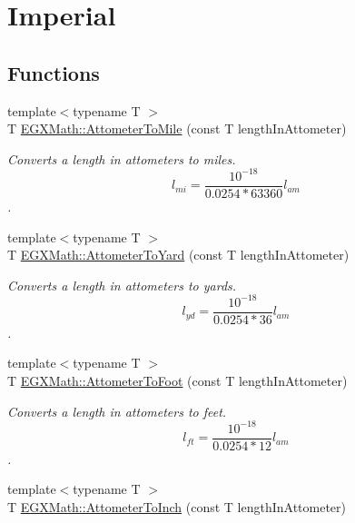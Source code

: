 \hypertarget{group___e_g_x_math-_conversions-_length_conversions-_attometer-_imperial}{}\section{Imperial}
\label{group___e_g_x_math-_conversions-_length_conversions-_attometer-_imperial}
\subsection*{Functions}
\begin{DoxyCompactItemize}
\item 
{\footnotesize template$<$typename T $>$ }\\T \mbox{\hyperlink{group___e_g_x_math-_conversions-_length_conversions-_attometer-_imperial_ga5525f722f588a2bb0a480c56d452fd3f}{E\+G\+X\+Math\+::\+Attometer\+To\+Mile}} (const T length\+In\+Attometer)
\begin{DoxyCompactList}\small\item\em Converts a length in attometers to miles. \[ l_{mi}=\frac{10^{-18}}{0.0254 * 63360} l_{am} \]. \end{DoxyCompactList}\item 
{\footnotesize template$<$typename T $>$ }\\T \mbox{\hyperlink{group___e_g_x_math-_conversions-_length_conversions-_attometer-_imperial_gaa88d881301681b0864a866ef45ad041c}{E\+G\+X\+Math\+::\+Attometer\+To\+Yard}} (const T length\+In\+Attometer)
\begin{DoxyCompactList}\small\item\em Converts a length in attometers to yards. \[ l_{yd}= \frac{10^{-18}}{0.0254 * 36} l_{am} \]. \end{DoxyCompactList}\item 
{\footnotesize template$<$typename T $>$ }\\T \mbox{\hyperlink{group___e_g_x_math-_conversions-_length_conversions-_attometer-_imperial_gaa4c9d59d58ec5811452592887a0261d9}{E\+G\+X\+Math\+::\+Attometer\+To\+Foot}} (const T length\+In\+Attometer)
\begin{DoxyCompactList}\small\item\em Converts a length in attometers to feet. \[ l_{ft}= \frac{10^{-18}}{0.0254 * 12} l_{am} \]. \end{DoxyCompactList}\item 
{\footnotesize template$<$typename T $>$ }\\T \mbox{\hyperlink{group___e_g_x_math-_conversions-_length_conversions-_attometer-_imperial_ga76cb652df52a89284cc3661a670d4990}{E\+G\+X\+Math\+::\+Attometer\+To\+Inch}} (const T length\+In\+Attometer)

\end{DoxyCompactItemize}
